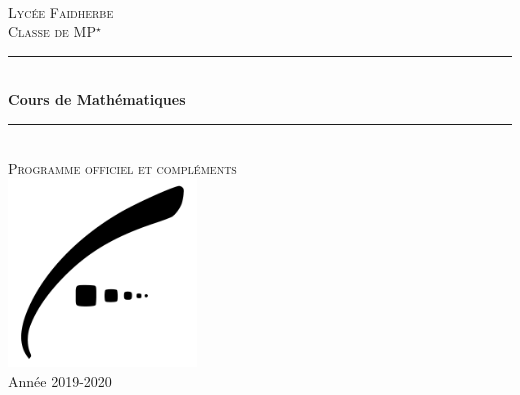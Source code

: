 \documentclass{report}
\begin{document}
\pagestyle{empty}
\begin{center}

    ~ \vfill

    \textsc{\LARGE Lycée Faidherbe}\\[1.5cm]
    \textsc{\Large Classe de MP$^\star$}\\[0.5cm]

    \rule{\linewidth}{0.5mm} \\[0.4cm]
    {\huge \bfseries Cours de Mathématiques }\\[0.1cm]
    \rule{\linewidth}{0.5mm} \\[0.4cm]
    \textsc{\large Programme officiel et compléments}\\[1.5cm]

    \vfill
    \includegraphics[width=5cm]{faidherbe.pdf}\\[1cm]
    \vfill
    {\large Année 2019-2020}\\
\end{center}

\dominitoc
\tableofcontents
\faketableofcontents
\end{document}
